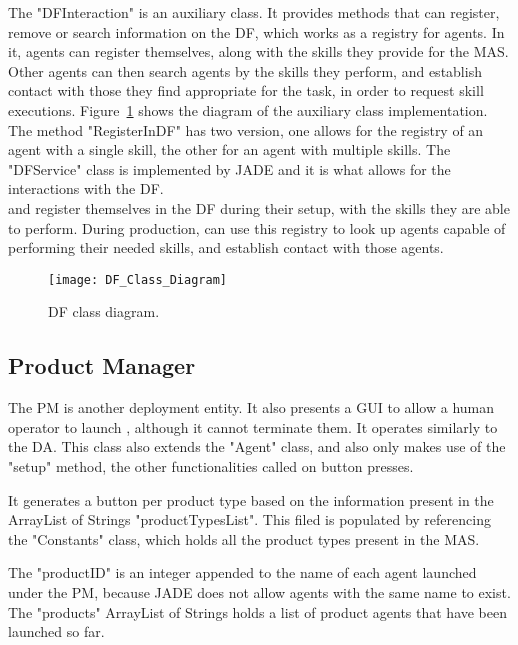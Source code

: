 The "DFInteraction" is an auxiliary class. It provides methods that can register, remove or search information on the \acrshort{DF}, which works as a registry for agents. In it, agents can register themselves, along with the skills they provide for the \acrshort{MAS}. Other agents can then search agents by the skills they perform, and establish contact with those they find appropriate for the task, in order to request skill executions. Figure~\ref{fig:df_class_diagram} shows the diagram of the auxiliary class implementation. The method "RegisterInDF" has two version, one allows for the registry of an agent with a single skill, the other for an agent with multiple skills. The "DFService" class is implemented by \acrshort{JADE} and it is what allows for the interactions with the \acrshort{DF}.\\

 and  register themselves in the \acrshort{DF} during their setup, with the skills they are able to perform. During production,  can use this registry to look up agents capable of performing their needed skills, and establish contact with those agents.

\begin{figure}[h!]
	\centering
	\texttt{[image: DF\_Class\_Diagram]}
	\caption{\acrlong{DF} class diagram.}
	\label{fig:df_class_diagram}
\end{figure}

\subsection{Product Manager}
\label{subsec:product_manager_agent}

The \acrfull{PM} is another deployment entity. It also presents a \acrshort{GUI} to allow a human operator to launch , although it cannot terminate them. It operates similarly to the \acrshort{DA}. This class also extends the "Agent" class, and also only makes use of the "setup" method, the other functionalities called on button presses.

It generates a button per product type based on the information present in the ArrayList of Strings "productTypesList". This filed is populated by referencing the "Constants" class, which holds all the product types present in the \acrshort{MAS}. 

The "productID" is an integer appended to the name of each agent launched under the \acrshort{PM}, because \acrshort{JADE} does not allow agents with the same name to exist. The "products" ArrayList of Strings holds a list of product agents that have been launched so far.

